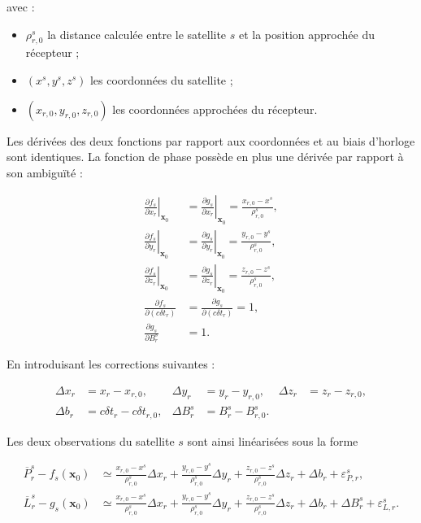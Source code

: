 avec :

\begin{itemize}
    \item $\rho_{r,0}^s$ la distance calculée entre le satellite $s$ et la
    position approchée du récepteur ;
    \item $(x^s,y^s,z^s)$ les coordonnées du satellite ;
    \item $(x_{r,0},y_{r,0},z_{r,0})$ les coordonnées approchées du
    récepteur.
\end{itemize}

Les dérivées des deux fonctions par rapport aux coordonnées et au biais
d'horloge sont identiques. La fonction de phase possède en plus une dérivée
par rapport à son ambiguïté :

\begin{align}
\left.\frac{\partial f_s}{\partial x_r}\right|_{\mathbf x_0}
&=
\left.\frac{\partial g_s}{\partial x_r}\right|_{\mathbf x_0}
=\frac{x_{r,0}-x^s}{\rho_{r,0}^s},
\\
\left.\frac{\partial f_s}{\partial y_r}\right|_{\mathbf x_0}
&=
\left.\frac{\partial g_s}{\partial y_r}\right|_{\mathbf x_0}
=\frac{y_{r,0}-y^s}{\rho_{r,0}^s},
\\
\left.\frac{\partial f_s}{\partial z_r}\right|_{\mathbf x_0}
&=
\left.\frac{\partial g_s}{\partial z_r}\right|_{\mathbf x_0}
=\frac{z_{r,0}-z^s}{\rho_{r,0}^s},
\\
\frac{\partial f_s}{\partial(c\delta t_r)}
&=
\frac{\partial g_s}{\partial(c\delta t_r)}=1,
\\
\frac{\partial g_s}{\partial B_r^s}
&=1.
\label{eq:component_observation_derivatives}
\end{align}


En introduisant les corrections suivantes :

\begin{align}
\Delta x_r&=x_r-x_{r,0},
&
\Delta y_r&=y_r-y_{r,0},
&
\Delta z_r&=z_r-z_{r,0},
\\
\Delta b_r&=c\delta t_r-c\delta t_{r,0},
&
\Delta B_r^s&=B_r^s-B_{r,0}^s.
\label{eq:state_component_corrections}
\end{align}

Les deux observations du satellite $s$ sont ainsi linéarisées sous la forme

\begin{align}
\overline P_r^s-f_s(\mathbf x_0)
&\simeq
\frac{x_{r,0}-x^s}{\rho_{r,0}^s}\Delta x_r
+\frac{y_{r,0}-y^s}{\rho_{r,0}^s}\Delta y_r
+\frac{z_{r,0}-z^s}{\rho_{r,0}^s}\Delta z_r
+\Delta b_r+\varepsilon_{P,r}^s,
\\
\overline L_r^s-g_s(\mathbf x_0)
&\simeq
\frac{x_{r,0}-x^s}{\rho_{r,0}^s}\Delta x_r
+\frac{y_{r,0}-y^s}{\rho_{r,0}^s}\Delta y_r
+\frac{z_{r,0}-z^s}{\rho_{r,0}^s}\Delta z_r
+\Delta b_r+\Delta B_r^s+\varepsilon_{L,r}^s.
\label{eq:component_linearized_observations}
\end{align}

